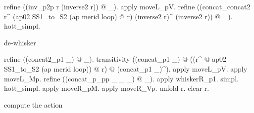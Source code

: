 \begin{coqdoccode}
\begin{coqdoccomment}
\coqdocindent{1.00em}
refine\coqdocindent{0.50em}
((inv\_p2p\coqdocindent{0.50em}
r\coqdocindent{0.50em}
(inverse2\coqdocindent{0.50em}
r))\coqdocindent{0.50em}
@\coqdocindent{0.50em}
\_).\coqdoceol
\coqdocindent{1.00em}
apply\coqdocindent{0.50em}
moveL\_pV.\coqdoceol
\coqdocindent{1.00em}
refine\coqdocindent{0.50em}
((concat\_concat2\coqdocindent{0.50em}
r\^{}\coqdocindent{0.50em}
(ap02\coqdocindent{0.50em}
SS1\_to\_S2\coqdocindent{0.50em}
(ap\coqdocindent{0.50em}
merid\coqdocindent{0.50em}
loop)\coqdocindent{0.50em}
@\coqdocindent{0.50em}
r)\coqdocindent{0.50em}
(inverse2\coqdocindent{0.50em}
r)\^{}\coqdocindent{0.50em}
(inverse2\coqdocindent{0.50em}
r))\coqdocindent{0.50em}
@\coqdocindent{0.50em}
\_).\coqdoceol
\coqdocindent{1.00em}
hott\_simpl.\coqdoceol
\coqdoceol
\coqdocindent{1.00em}
\begin{coqdoccomment}
\coqdocindent{0.50em}
de-whisker\coqdocindent{0.50em}
\end{coqdoccomment}
\coqdoceol
\coqdocindent{1.00em}
refine\coqdocindent{0.50em}
((concat2\_p1\coqdocindent{0.50em}
\_)\coqdocindent{0.50em}
@\coqdocindent{0.50em}
\_).\coqdoceol
\coqdocindent{1.00em}
transitivity\coqdocindent{0.50em}
((concat\_p1\coqdocindent{0.50em}
\_)\coqdocindent{0.50em}
\coqdoceol
\coqdocindent{8.00em}
@\coqdocindent{0.50em}
((r\^{}\coqdocindent{0.50em}
@\coqdocindent{0.50em}
ap02\coqdocindent{0.50em}
SS1\_to\_S2\coqdocindent{0.50em}
(ap\coqdocindent{0.50em}
merid\coqdocindent{0.50em}
loop))\coqdocindent{0.50em}
@\coqdocindent{0.50em}
r)\coqdocindent{0.50em}
\coqdoceol
\coqdocindent{8.00em}
@\coqdocindent{0.50em}
(concat\_p1\coqdocindent{0.50em}
\_)\^{}).\coqdoceol
\coqdocindent{1.00em}
apply\coqdocindent{0.50em}
moveL\_pV.\coqdocindent{0.50em}
apply\coqdocindent{0.50em}
moveL\_Mp.\coqdocindent{0.50em}
\coqdoceol
\coqdocindent{1.00em}
refine\coqdocindent{0.50em}
((concat\_p\_pp\coqdocindent{0.50em}
\_\coqdocindent{0.50em}
\_\coqdocindent{0.50em}
\_)\coqdocindent{0.50em}
@\coqdocindent{0.50em}
\_).\coqdocindent{0.50em}
\coqdoceol
\coqdocindent{1.00em}
apply\coqdocindent{0.50em}
whiskerR\_p1.\coqdocindent{0.50em}
simpl.\coqdocindent{0.50em}
hott\_simpl.\coqdoceol
\coqdocindent{1.00em}
apply\coqdocindent{0.50em}
moveR\_pM.\coqdocindent{0.50em}
apply\coqdocindent{0.50em}
moveR\_Vp.\coqdoceol
\coqdocindent{1.00em}
unfold\coqdocindent{0.50em}
r.\coqdocindent{0.50em}
clear\coqdocindent{0.50em}
r.\coqdoceol
\coqdoceol
\coqdocindent{1.00em}
\begin{coqdoccomment}
\coqdocindent{0.50em}
compute\coqdocindent{0.50em}
the\coqdocindent{0.50em}
action\coqdocindent{0.50em}

\end{coqdoccomment}
\end{coqdoccomment}
\end{coqdoccode}
